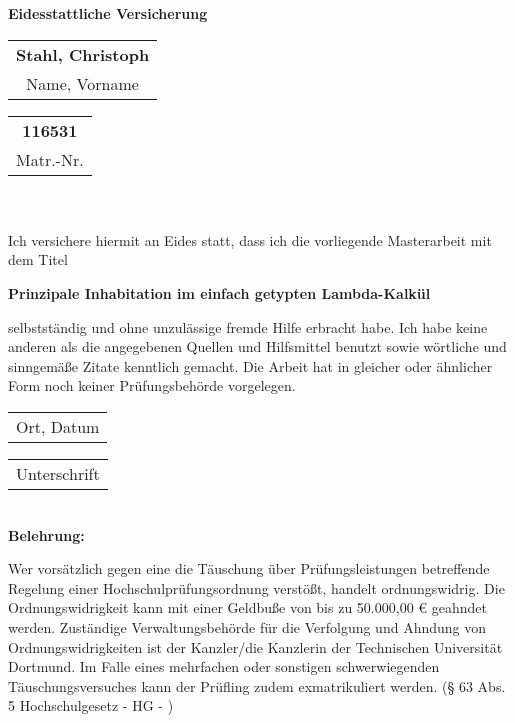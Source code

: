 \cleardoublepage
{}
\pagestyle{plain}
\begin{center}
	\Huge
	\sffamily
	\textbf{Eidesstattliche Versicherung}
\end{center}
\vspace{1cm}
\normalsize
\begin{tabular}{c}
\textbf{Stahl, Christoph}\\
Name, Vorname
\end{tabular}\hfill 
\begin{tabular}{c}
	\textbf{116531}\\
Matr.-Nr.
\end{tabular}\\
\vspace*{1cm}\\
Ich versichere hiermit an Eides statt, dass ich die vorliegende Masterarbeit mit dem Titel 

\begin{center}
\begin{minipage}{.5\textwidth}
\begin{center}
	\textbf{Prinzipale Inhabitation im einfach getypten Lambda-Kalkül}
\end{center}
\end{minipage}
\end{center}

\noindent selbstständig und ohne unzulässige fremde Hilfe erbracht habe. Ich habe keine anderen als die angegebenen Quellen und Hilfsmittel benutzt sowie wörtliche und sinngemäße Zitate kenntlich gemacht. Die Arbeit hat in gleicher oder ähnlicher Form noch keiner Prüfungsbehörde vorgelegen. 


\begin{tabular}{c}
	\vspace{4em}\hspace*{4cm}\\
	\hline
	Ort, Datum
\end{tabular}
\hfill
\begin{tabular}{c}
	\vspace{4em}\hspace*{4cm}\\
\hline
	Unterschrift
\end{tabular}\\

\noindent\textbf{Belehrung: }

\noindent Wer vorsätzlich gegen eine die Täuschung über Prüfungsleistungen betreffende Regelung einer Hochschulprüfungsordnung verstößt, handelt ordnungswidrig. Die Ordnungswidrigkeit kann mit einer Geldbuße von bis zu 50.000,00 \euro{} geahndet werden. Zuständige Verwaltungsbehörde für die Verfolgung und Ahndung von Ordnungswidrigkeiten ist der Kanzler/die Kanzlerin der Technischen Universität Dortmund. Im Falle eines mehrfachen oder sonstigen schwerwiegenden Täuschungsversuches kann der Prüfling zudem exmatrikuliert werden. (§ 63 Abs. 5 Hochschulgesetz - HG - )  

